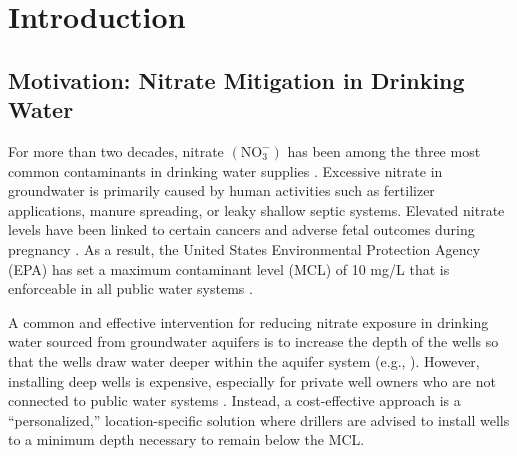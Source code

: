 \documentclass[12pt]{article}
\begin{document}
\section{Introduction}


\subsection{Motivation: Nitrate Mitigation in Drinking Water}

For more than two decades, nitrate $(\mathrm{NO_3^{-}})$ has been among the three most common contaminants in drinking water supplies \citep{Pennino2017}. Excessive nitrate in groundwater is primarily caused by human activities such as fertilizer applications, manure spreading, or leaky shallow septic systems. Elevated nitrate levels have been linked to certain cancers and adverse fetal outcomes during pregnancy \citep{Ward2005}. As a result, the United States Environmental Protection Agency (EPA) has set a maximum contaminant level (MCL) of 10 mg/L that is enforceable in all public water systems \citep{USEPA1995a}.


 A common and effective intervention for reducing nitrate exposure in drinking water sourced from groundwater aquifers is to increase the depth of the wells so that the wells draw water deeper within the aquifer system (e.g., \citet{Spalding1993, nitrate2025}).
However, installing deep wells is expensive, especially for private well owners who are not connected to public water systems \citep{nitrate2025}. Instead, a cost-effective approach is a ``personalized,'' location-specific solution where drillers are advised to install wells to a minimum depth necessary to remain below the MCL.
\end{document}
